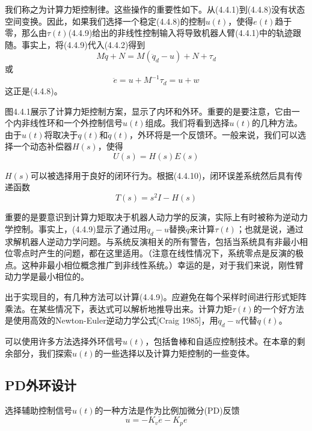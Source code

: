 \documentclass[UTF8]{ctexart}
\theoremstyle{definition}
\begin{document}
我们称之为计算力矩控制律。这些操作的重要性如下。从(4.4.1)到(4.4.8)没有状态空间变换。因此，如果我们选择一个稳定(4.4.8)的控制$u(t)$，使得$e(t)$趋于零，那么由$\tau(t)$(4.4.9)给出的非线性控制输入将导致机器人臂(4.4.1)中的轨迹跟随。事实上，将(4.4.9)代入(4.4.2)得到
\begin{equation}
    M\ddot{q} + N = M(\ddot{q}_d - u) + N + \tau_d
\end{equation}
或
\begin{equation}
    \ddot{e} = u + M^{-1}\tau_d = u + w
\end{equation}
这正是(4.4.8)。

图4.4.1展示了计算力矩控制方案，显示了内环和外环。重要的是要注意，它由一个内非线性环和一个外控制信号$u(t)$组成。我们将看到选择$u(t)$的几种方法。由于$u(t)$将取决于$q(t)$和$\dot{q}(t)$，外环将是一个反馈环。一般来说，我们可以选择一个动态补偿器$H(s)$，使得
\begin{equation}
    U(s) = H(s)E(s)
\end{equation}

$H(s)$可以被选择用于良好的闭环行为。根据(4.4.10)，闭环误差系统然后具有传递函数
\begin{equation}
    T(s) = s^2I - H(s)
\end{equation}

重要的是要意识到计算力矩取决于机器人动力学的反演，实际上有时被称为逆动力学控制。事实上，(4.4.9)显示了通过用$\ddot{q}_d - u$替换$\ddot{q}$来计算$\tau(t)$；也就是说，通过求解机器人逆动力学问题。与系统反演相关的所有警告，包括当系统具有非最小相位零点时产生的问题，都在这里适用。（注意在线性情况下，系统零点是反演的极点。这种非最小相位概念推广到非线性系统。）幸运的是，对于我们来说，刚性臂动力学是最小相位的。

出于实现目的，有几种方法可以计算(4.4.9)。应避免在每个采样时间进行形式矩阵乘法。在某些情况下，表达式可以解析地推导出来。计算力矩$\tau(t)$的一个好方法是使用高效的Newton-Euler逆动力学公式[Craig 1985]，用$\ddot{q}_d - u$代替$\ddot{q}(t)$。

可以使用许多方法选择外环信号$u(t)$，包括鲁棒和自适应控制技术。在本章的剩余部分，我们探索$u(t)$的一些选择以及计算力矩控制的一些变体。

\subsection{PD外环设计}

选择辅助控制信号$u(t)$的一种方法是作为比例加微分(PD)反馈
\begin{equation}
    u = -K_v\dot{e} - K_pe
\end{equation}
\end{document}
